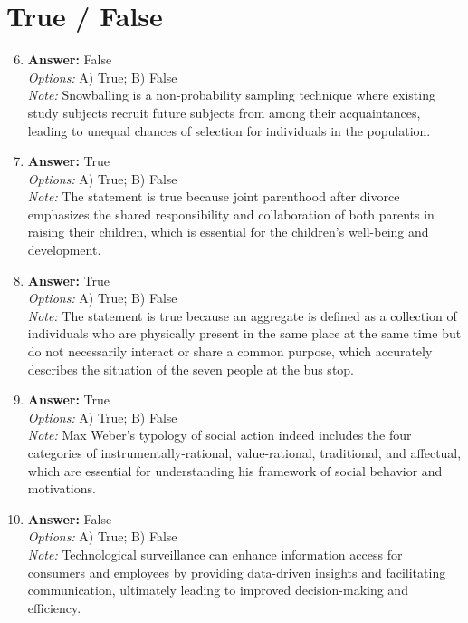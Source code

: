 \documentclass[12pt]{article}
\begin{document}
\section*{True / False}
\begin{enumerate}[label=\arabic*.]
\setcounter{enumi}{5}
\item \textbf{Answer:} False
\\ \textit{Options:} A) True; B) False
\\ \textit{Note:} Snowballing is a non-probability sampling technique where existing study subjects recruit future subjects from among their acquaintances, leading to unequal chances of selection for individuals in the population.
\item \textbf{Answer:} True
\\ \textit{Options:} A) True; B) False
\\ \textit{Note:} The statement is true because joint parenthood after divorce emphasizes the shared responsibility and collaboration of both parents in raising their children, which is essential for the children's well-being and development.
\item \textbf{Answer:} True
\\ \textit{Options:} A) True; B) False
\\ \textit{Note:} The statement is true because an aggregate is defined as a collection of individuals who are physically present in the same place at the same time but do not necessarily interact or share a common purpose, which accurately describes the situation of the seven people at the bus stop.
\item \textbf{Answer:} True
\\ \textit{Options:} A) True; B) False
\\ \textit{Note:} Max Weber's typology of social action indeed includes the four categories of instrumentally-rational, value-rational, traditional, and affectual, which are essential for understanding his framework of social behavior and motivations.
\item \textbf{Answer:} False
\\ \textit{Options:} A) True; B) False
\\ \textit{Note:} Technological surveillance can enhance information access for consumers and employees by providing data-driven insights and facilitating communication, ultimately leading to improved decision-making and efficiency.
\end{enumerate}
\end{document}
